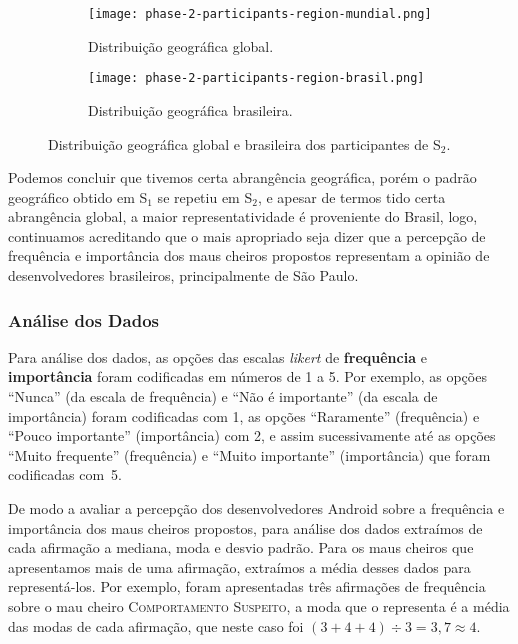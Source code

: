 \begin{figure*}[!htb]
\centering
\vspace{-.3cm} 
\begin{subfigure}{.52\textwidth}
  \centering
  \texttt{[image: phase-2-participants-region-mundial.png]}
  \caption{Distribuição geográfica global.}
  \label{fig:phase2-participants-regions-global}
\end{subfigure}
\begin{subfigure}{.46\textwidth}
  \centering
  \texttt{[image: phase-2-participants-region-brasil.png]}
  \caption{Distribuição geográfica brasileira.}
  \label{fig:phase2-participants-regions-brasil}
\end{subfigure}%
\caption{Distribuição geográfica global e brasileira dos participantes de S$_2$.}
\label{fig:phase2-participants-regions}
\end{figure*}

Podemos concluir que tivemos certa abrangência geográfica, porém o padrão geográfico obtido em S$_1$ se repetiu em S$_2$, e apesar de termos tido certa abrangência global, a maior representatividade é proveniente do Brasil, logo, continuamos acreditando que o mais apropriado seja dizer que a percepção de frequência e importância dos maus cheiros propostos representam a opinião de desenvolvedores brasileiros, principalmente de São Paulo.


\subsubsection{Análise dos Dados}
\label{etapa-2-analise}

Para análise dos dados, as opções das escalas \textit{likert} de \textbf{\small frequência} e \textbf{\small importância} foram codificadas em números de 1 a 5. Por exemplo, as opções ``Nunca'' (da escala de frequência) e ``Não é importante'' (da escala de importância) foram codificadas com 1, as opções ``Raramente'' (frequência) e ``Pouco importante'' (importância) com 2, e assim sucessivamente até as opções ``Muito frequente'' (frequência) e ``Muito importante'' (importância) que foram codificadas com~5.

De modo a avaliar a percepção dos desenvolvedores Android sobre a frequência e importância dos maus cheiros propostos, para análise dos dados extraímos de cada afirmação a mediana, moda e desvio padrão. Para os maus cheiros que apresentamos mais de uma afirmação, extraímos a média desses dados para representá-los. Por exemplo, foram apresentadas três afirmações de frequência sobre o mau cheiro \textsc{\small Comportamento Suspeito}, a moda que o representa é a média das modas de cada afirmação, que neste caso foi $(3 + 4 + 4) \div 3 = 3,7 \approx 4$.

